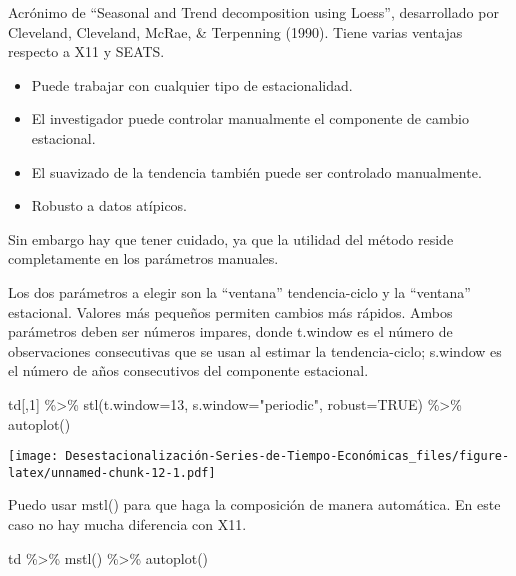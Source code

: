 \documentclass[
]{article}
\newenvironment{Shaded}{\begin{snugshade}}{\end{snugshade}}
\newcommand{\AttributeTok}[1]{\textcolor[rgb]{0.77,0.63,0.00}{#1}}
\newcommand{\ConstantTok}[1]{\textcolor[rgb]{0.00,0.00,0.00}{#1}}
\newcommand{\DecValTok}[1]{\textcolor[rgb]{0.00,0.00,0.81}{#1}}
\newcommand{\FunctionTok}[1]{\textcolor[rgb]{0.00,0.00,0.00}{#1}}
\newcommand{\NormalTok}[1]{#1}
\newcommand{\SpecialCharTok}[1]{\textcolor[rgb]{0.00,0.00,0.00}{#1}}
\newcommand{\StringTok}[1]{\textcolor[rgb]{0.31,0.60,0.02}{#1}}
\providecommand{\tightlist}{%
  \setlength{\itemsep}{0pt}\setlength{\parskip}{0pt}}
\begin{document}
Acrónimo de ``Seasonal and Trend decomposition using Loess'',
desarrollado por Cleveland, Cleveland, McRae, \& Terpenning (1990).
Tiene varias ventajas respecto a X11 y SEATS.

\begin{itemize}
\tightlist
\item
  Puede trabajar con cualquier tipo de estacionalidad.
\item
  El investigador puede controlar manualmente el componente de cambio
  estacional.
\item
  El suavizado de la tendencia también puede ser controlado manualmente.
\item
  Robusto a datos atípicos.
\end{itemize}

Sin embargo hay que tener cuidado, ya que la utilidad del método reside
completamente en los parámetros manuales.

Los dos parámetros a elegir son la ``ventana'' tendencia-ciclo y la
``ventana'' estacional. Valores más pequeños permiten cambios más
rápidos. Ambos parámetros deben ser números impares, donde t.window es
el número de observaciones consecutivas que se usan al estimar la
tendencia-ciclo; s.window es el número de años consecutivos del
componente estacional.

\begin{Shaded}
\begin{Highlighting}[]
\NormalTok{td[,}\DecValTok{1}\NormalTok{] }\SpecialCharTok{\%\textgreater{}\%}
  \FunctionTok{stl}\NormalTok{(}\AttributeTok{t.window=}\DecValTok{13}\NormalTok{, }\AttributeTok{s.window=}\StringTok{"periodic"}\NormalTok{, }\AttributeTok{robust=}\ConstantTok{TRUE}\NormalTok{) }\SpecialCharTok{\%\textgreater{}\%}
  \FunctionTok{autoplot}\NormalTok{()}
\end{Highlighting}
\end{Shaded}

\texttt{[image: Desestacionalización-Series-de-Tiempo-Económicas\_files/figure-latex/unnamed-chunk-12-1.pdf]}

Puedo usar mstl() para que haga la composición de manera automática. En
este caso no hay mucha diferencia con X11.

\begin{Shaded}
\begin{Highlighting}[]
\NormalTok{td }\SpecialCharTok{\%\textgreater{}\%}
  \FunctionTok{mstl}\NormalTok{() }\SpecialCharTok{\%\textgreater{}\%}
  \FunctionTok{autoplot}\NormalTok{()}
\end{Highlighting}
\end{Shaded}
\end{document}
